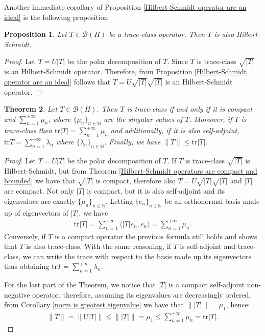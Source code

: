 \documentclass[corpo=11pt, stile=classica, tipotesi=custom,
greek, evenboxes, english]{toptesi}
\numberwithin{equation}{chapter}
\newtheorem{teo}{Theorem}[chapter] %
\newtheorem{prop}[teo]{Proposition}
\theoremstyle{remark}
\newcommand{\N}{\mathbb{N}} %
\newcommand{\B}{\mathscr{B}} %
\begin{document}
Another immediate corollary of Proposition \ref{Hilbert-Schmidt operator are an ideal} is the following proposition
\begin{prop}\label{trace-class operators are Hilbert-Schmidt}
	Let $T \in \B(H)$ be a trace-class operator. Then $T$ is also Hilbert-Schmidt.
\end{prop}
\begin{proof}
	Let $T = U |T|$ be the polar decomposition of $T$. Since $T$ is trace-class $\sqrt{|T|}$ is an Hilbert-Schmidt operator. Therefore, from Proposition \ref{Hilbert-Schmidt operator are an ideal} follows that $T = U \sqrt{|T|} \sqrt{|T|}$ is an Hilbert-Schmidt operator.
\end{proof}

\begin{teo}\label{trace-class operators are compact and bounded}
	Let $T \in \B(H)$. Then $T$ is trace-class if and only if it is compact and $\sum_{n=1}^{+\infty} \mu_n$, where $\{\mu_n\}_{n \in \N}$ are the singular values of $T$. Moreover, if $T$ is trace-class then $\mathrm{tr}|T| = \sum_{n=1}^{+\infty} \mu_n$ and additionally, if it is also self-adjoint, $\mathrm{tr}T = \sum_{n=1}^{+\infty} \lambda_n$ where $\{\lambda_n\}_{n \in \N}$. Finally, we have $\|T\| \leq \mathrm{tr}|T|$.
\end{teo}
\begin{proof}
	Let $T = U|T|$ be the polar decomposition of $T$. If $T$ is trace-class $\sqrt{|T|}$ is Hilbert-Schmidt, but from Theorem \ref{Hilbert-Schmidt operators are compact and bounded} we have that $\sqrt{|T|}$ is compact, therefore also $T = U \sqrt{|T|}\sqrt{|T|}$ and $|T|$ are compact. Not only $|T|$ is compact, but it is also self-adjoint and its eigenvalues are exactly $\{\mu_n\}_{n \in \N}$. Letting $\{e_n\}_{n \in \N}$ be an orthonormal basis made up of eigenvectors of $|T|$, we have
	\begin{align*}
		\mathrm{tr}|T| = \sum_{n=1}^{+\infty} \langle |T|e_n,e_n \rangle = \sum_{n=1}^{+\infty} \mu_n.
	\end{align*}
	Conversely, if $T$ is a compact operator the previous formula still holds and shows that $T$ is also trace-class. With the same reasoning, if $T$ is self-adjoint and trace-class, we can write the trace with respect to the basis made up its eigenvectors thus obtaining $\mathrm{tr}T = \sum_{n=1}^{+\infty} \lambda_n$.
	
	For the last part of the Theorem, we notice that $|T|$ is a compact self-adjoint non-negative operator, therefore, assuming its eigenvalues are decreasingly ordered, from Corollary \ref{norm is greatest eigenvalue} we have that $\| |T| \| = \mu_1$, hence:
	\begin{align*}
		\| T \| = \| U |T| \| \leq \| |T| \| = \mu_1 \leq \sum_{n=1}^{+\infty} \mu_n = \mathrm{tr}|T|.
	\end{align*} 	
\end{proof}
\end{document}
